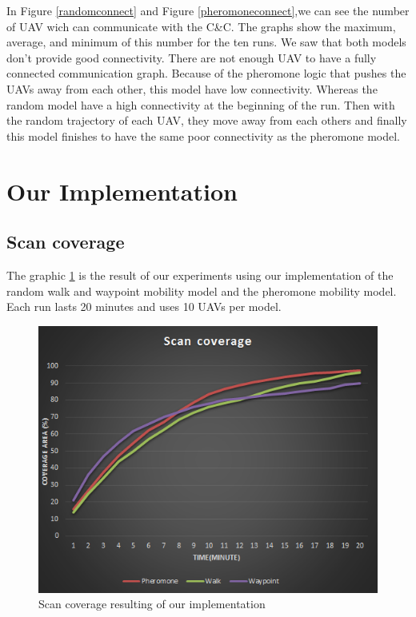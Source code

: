 In Figure \ref{randomconnect} and Figure \ref{pheromoneconnect},we can see the number of UAV wich can communicate with the C\&C.  The  graphs  show the maximum, average, and minimum of this number for the ten runs. We saw that both models don't provide good connectivity. There are not enough UAV to have a fully connected communication graph. Because of the pheromone logic that pushes the UAVs away from each other, this model have low connectivity. Whereas the random model have a high connectivity at the beginning of the run. Then with the random trajectory of each UAV, they move away from each others and finally this model finishes to have the same poor connectivity as the pheromone model.

\section{Our Implementation}

\subsection{Scan coverage}

The graphic \ref{scancoverage} is the result of our experiments using our implementation of the random walk and waypoint mobility model and the pheromone mobility model. Each run lasts 20 minutes and uses 10 UAVs per model.

\newpage

\begin{figure}[!hbtf]
\centering
   \includegraphics{../images/ScanCoverageResult.png}
\caption{\label{scancoverage} Scan coverage resulting of our implementation}
\end{figure}

